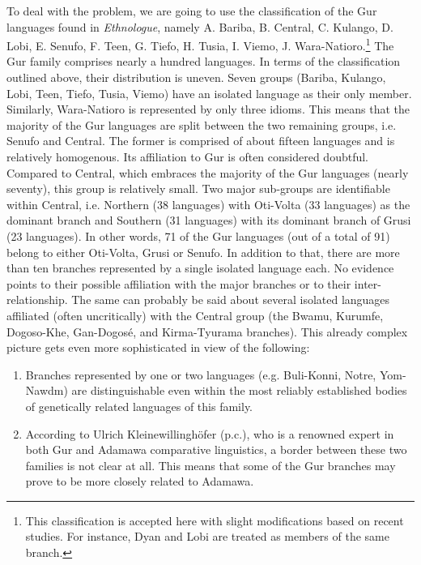 To deal with the problem, we are going to use the classification of the Gur languages found in \textit{Ethnologue}, namely A. Bariba, B. Central, C. Kulango, D. Lobi, E. Senufo, F. Teen, G. Tiefo, H. Tusia, I. Viemo, J. Wara-Natioro.\footnote{This classification is accepted here with slight modifications based on recent studies. For instance, Dyan and Lobi  are treated as members of the same branch.} The Gur family comprises nearly a hundred languages. In terms of the classification outlined above, their distribution is uneven. Seven groups (Bariba, Kulango, Lobi, Teen, Tiefo, Tusia, Viemo) have an isolated language as their only member. Similarly, Wara-Natioro is represented by only three idioms. This means that the majority of the Gur languages are split between the two remaining groups, i.e. Senufo and Central. The former is comprised of about fifteen languages and is relatively homogenous. Its affiliation to Gur is often considered doubtful. Compared to Central, which embraces the majority of the Gur languages (nearly seventy), this group is relatively small. Two major sub-groups are identifiable within Central, i.e. Northern (38 languages) with Oti-Volta (33 languages) as the dominant branch and Southern (31 languages) with its dominant branch of Grusi (23 languages). In other words, 71 of the Gur languages (out of a total of 91) belong to either Oti-Volta, Grusi or Senufo. In addition to that, there are more than ten branches represented by a single isolated language each. No evidence points to their possible affiliation with the major branches or to their inter-relationship. The same can probably be said about several isolated languages affiliated (often uncritically) with the Central group (the Bwamu, Kurumfe, Dogoso-Khe, Gan-Dogosé, and Kirma-Tyurama branches). This already complex picture gets even more sophisticated in view of the following: 

\begin{enumerate}
 \item Branches represented by one or two languages (e.g. Buli-Konni, Notre, Yom-Nawdm) are distinguishable even within the most reliably established bodies of genetically related languages of this family.
 \item  According to Ulrich Kleinewillinghöfer (p.c.), who is a renowned expert in both Gur and Adamawa comparative linguistics, a border between these two families is not clear at all. This means that some of the Gur branches may prove to be more closely related to Adamawa. 
\end{enumerate}
 

